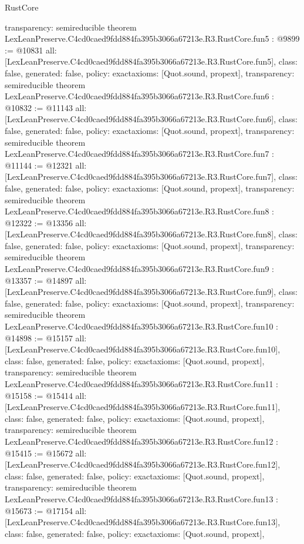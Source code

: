 \begin{lexlean}{RustCore}
\begin{coremodule}
{  transparency: semireducible
}
theorem LexLeanPreserve.C4cd0caed9fdd884fa395b3066a67213e.R3.RustCore.fun5 : @9899 := @10831 {
  all: [LexLeanPreserve.C4cd0caed9fdd884fa395b3066a67213e.R3.RustCore.fun5],
  class: false,
  generated: false,
  policy: exact{axioms: [Quot.sound, propext]},
  transparency: semireducible
}
theorem LexLeanPreserve.C4cd0caed9fdd884fa395b3066a67213e.R3.RustCore.fun6 : @10832 := @11143 {
  all: [LexLeanPreserve.C4cd0caed9fdd884fa395b3066a67213e.R3.RustCore.fun6],
  class: false,
  generated: false,
  policy: exact{axioms: [Quot.sound, propext]},
  transparency: semireducible
}
theorem LexLeanPreserve.C4cd0caed9fdd884fa395b3066a67213e.R3.RustCore.fun7 : @11144 := @12321 {
  all: [LexLeanPreserve.C4cd0caed9fdd884fa395b3066a67213e.R3.RustCore.fun7],
  class: false,
  generated: false,
  policy: exact{axioms: [Quot.sound, propext]},
  transparency: semireducible
}
theorem LexLeanPreserve.C4cd0caed9fdd884fa395b3066a67213e.R3.RustCore.fun8 : @12322 := @13356 {
  all: [LexLeanPreserve.C4cd0caed9fdd884fa395b3066a67213e.R3.RustCore.fun8],
  class: false,
  generated: false,
  policy: exact{axioms: [Quot.sound, propext]},
  transparency: semireducible
}
theorem LexLeanPreserve.C4cd0caed9fdd884fa395b3066a67213e.R3.RustCore.fun9 : @13357 := @14897 {
  all: [LexLeanPreserve.C4cd0caed9fdd884fa395b3066a67213e.R3.RustCore.fun9],
  class: false,
  generated: false,
  policy: exact{axioms: [Quot.sound, propext]},
  transparency: semireducible
}
theorem LexLeanPreserve.C4cd0caed9fdd884fa395b3066a67213e.R3.RustCore.fun10 : @14898 := @15157 {
  all: [LexLeanPreserve.C4cd0caed9fdd884fa395b3066a67213e.R3.RustCore.fun10],
  class: false,
  generated: false,
  policy: exact{axioms: [Quot.sound, propext]},
  transparency: semireducible
}
theorem LexLeanPreserve.C4cd0caed9fdd884fa395b3066a67213e.R3.RustCore.fun11 : @15158 := @15414 {
  all: [LexLeanPreserve.C4cd0caed9fdd884fa395b3066a67213e.R3.RustCore.fun11],
  class: false,
  generated: false,
  policy: exact{axioms: [Quot.sound, propext]},
  transparency: semireducible
}
theorem LexLeanPreserve.C4cd0caed9fdd884fa395b3066a67213e.R3.RustCore.fun12 : @15415 := @15672 {
  all: [LexLeanPreserve.C4cd0caed9fdd884fa395b3066a67213e.R3.RustCore.fun12],
  class: false,
  generated: false,
  policy: exact{axioms: [Quot.sound, propext]},
  transparency: semireducible
}
theorem LexLeanPreserve.C4cd0caed9fdd884fa395b3066a67213e.R3.RustCore.fun13 : @15673 := @17154 {
  all: [LexLeanPreserve.C4cd0caed9fdd884fa395b3066a67213e.R3.RustCore.fun13],
  class: false,
  generated: false,
  policy: exact{axioms: [Quot.sound, propext]},
}
\end{coremodule}
\end{lexlean}
